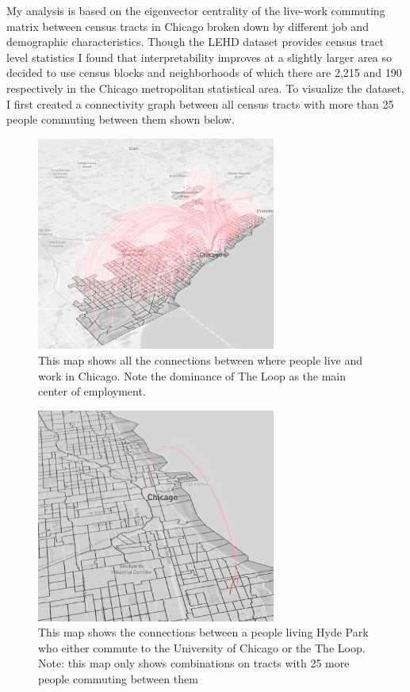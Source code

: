 \documentclass{article}
\theoremstyle{definition}
\theoremstyle{remark}
\begin{document}
My analysis is based on the eigenvector centrality of the live-work commuting matrix between census tracts in Chicago broken down by different job and demographic characteristics.  Though the LEHD dataset provides census tract level statistics I found that interpretability improves at a slightly larger area so decided to use census blocks and neighborhoods of which there are 2,215 and 190 respectively in the Chicago metropolitan statistical area.  To visualize the dataset, I first created a connectivity graph between all census tracts with more than 25 people commuting between them shown below.\\

\begin{figure}[H]
    \centering
    \includegraphics[width=0.7\textwidth]{arc-1}
    \caption{This map shows all the connections between where people live and work in Chicago.  Note the dominance of The Loop as the main center of employment.}
    \label{fig:arc-1}
\end{figure}

\begin{figure}[H]
    \centering
    \includegraphics[width=0.7\textwidth]{arc-2}
    \caption{This map shows the connections between a people living Hyde Park who either commute to the University of Chicago or the The Loop.  Note: this map only shows combinations on tracts with 25 more people commuting between them}
    \label{fig:arc-2}
\end{figure} \\
\end{document}
